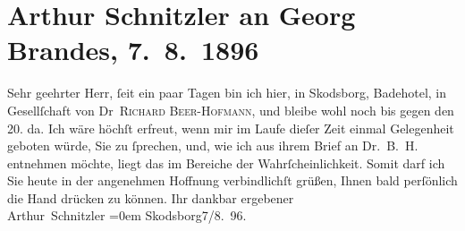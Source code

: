 

         
         \renewcommand{\erwaehntePersonen}{Personen: Richard Beer-Hofmann, Georg Brandes}
         \renewcommand{\erwaehnteOrte}{Orte: Badehotel, Skodsborg}
         \renewcommand{\erwaehnteWerke}{}
               \section[Arthur Schnitzler an Georg Brandes, 7. 8. 1896]{ Arthur Schnitzler an Georg Brandes, 7. 8. 1896}\nopagebreak{}\rehead{ }\begin{ledgroupsized}[t]{13cm}\normalsize\beginnumbering \toendnotes[C]{\smallbreak\pagebreak[2]} 
\pstart{}{\pb}Sehr geehrter Herr,\pend\pstart
           ſeit ein paar Tagen bin ich hier, in Skodsborg,
                        Badehotel, in Gesellſchaft von Dr \textsc{Richard Beer-Hofmann}, und bleibe wohl noch bis gegen den 20. da. Ich wäre
                    höchſt erfreut, wenn mir im Laufe dieſer Zeit einmal Gelegenheit geboten würde,
                    Sie zu ſprechen, und, wie ich aus ihrem Brief an Dr. B. H. entnehmen {\pb}möchte,
                    liegt das im Bereiche der Wahrſcheinlichkeit. Somit darf ich Sie heute in der
                    angenehmen Hoffnung verbindlichſt grüßen, Ihnen bald perſönlich die Hand drücken
                    zu können.\pend
           \pstart
           Ihr dankbar ergebener{\\[\baselineskip]}\spacefill\mbox{Arthur Schnitzler}\pend
           \leftskip=0em{}\pstart
           Skodsborg7/8. 96.\pend
           
         
         \endnumbering{}\end{ledgroupsized}  \newcommand{\dateiname}{L00578}\newcommand{\titel}{Arthur Schnitzler an Georg Brandes, 7. 8. 1896}\newcommand{\editorInnen}{Martin Anton Müller und Gerd-Hermann Susen}
      
